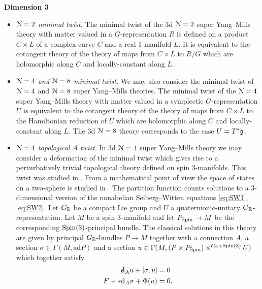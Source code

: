 \documentclass[10pt, oneside]{article}
\begin{document}
\textbf{Dimension 3}
\begin{itemize}
 \item \emph{$\mathcal N=2$ minimal twist.} The minimal twist of the 3d $\mathcal N=2$ super Yang--Mills theory with matter valued in a $G$-representation $R$ is defined on a product $C\times L$ of a complex curve $C$ and a real 1-manifold $L$. It is equivalent to the cotangent theory of the theory of maps from $C\times L$ to $R/G$ which are holomorphic along $C$ and locally-constant along $L$.
 \item \emph{$\mathcal N=4$ and $\mathcal N=8$ minimal twist.} We may also consider the minimal twist of $\mathcal N=4$ and $\mathcal N=8$ super Yang--Mills theories. The minimal twist of the $\mathcal N=4$ super Yang--Mills theory with matter valued in a symplectic $G$-representation $U$ is equivalent to the cotangent theory of the theory of maps from $C\times L$ to the Hamiltonian reduction of $U$ which are holomorphic along $C$ and locally-constant along $L$. The 3d $\mathcal N=8$ theory corresponds to the case $U=T^*\mathfrak g$.

 \item \emph{$\mathcal{N}=4$ topological A twist.} In 3d $\mathcal N=4$ super Yang--Mills theory we may consider a deformation of the minimal twist which gives rise to a perturbatively trivial topological theory defined on spin 3-manifolds. This twist was studied in \cite{BaulieuGrossman,BlauThompson1,Ohta}. From a mathematical point of view the space of states on a two-sphere is studied in \cite{BFN}. The partition function counts solutions to a 3-dimensional version of the nonabelian Seiberg--Witten equations \eqref{eq:SW1}, \eqref{eq:SW2}. Let $G_\mathbb R$ be a compact Lie group and $U$ a quaternionic-unitary $G_\mathbb R$-representation. Let $M$ be a spin 3-manifold and let $P_{\mathrm{Spin}}\rightarrow M$ be the corresponding $\mathrm{Spin}(3)$-principal bundle. The classical solutions in this theory are given by principal $G_\mathbb R$-bundles $P\rightarrow M$ together with a connection $A$, a section $\sigma\in\Gamma(M, \mathrm{ad} P)$ and a section $u\in\Gamma(M, (P\times P_{\mathrm{Spin}})\times^{G_\mathbb R\times \mathrm{Spin}(3)} U)$ which together satisfy
\begin{align}
\sd \d_A u + [\sigma, u]  &= 0 \label{eq:3dSW1} \\
F + \ast\d_A \sigma + \Phi(u) &= 0. \label{eq:3dSW2}
\end{align}


\end{itemize}
\end{document}
